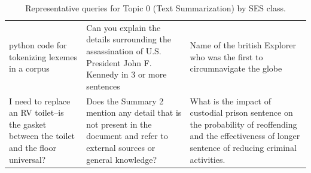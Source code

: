 \begin{table}[ht]
\begin{tabular}{p{4.3cm}p{4.3cm}p{4.3cm}}
python code for tokenizing lexemes in a corpus & Can you explain the details surrounding the assassination of U.S. President John F. Kennedy in 3 or more sentences & Name of the british Explorer who was the first to circumnavigate the globe \\[4pt]
I need to replace an RV toilet--is the gasket between the toilet and the floor universal? & Does the Summary 2 mention any detail that is not present in the document and refer to external sources or general knowledge? & What is the impact of custodial prison sentence on the probability of reoffending and the effectiveness of longer sentence of reducing criminal activities. \\[4pt]
\bottomrule
\end{tabular}
\caption{Representative queries for Topic 0 (Text Summarization) by SES class.}
\label{tab:repr_queries_topic0}
\end{table}

